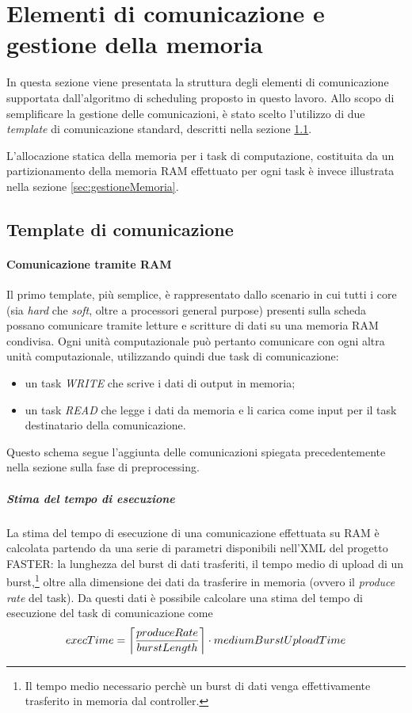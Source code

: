 
\section{Elementi di comunicazione e gestione della memoria}
\label{sec:elementiComunicazioneGestioneMemoria}
In questa sezione viene presentata la struttura degli elementi di comunicazione 
supportata dall'algoritmo di scheduling proposto in questo lavoro.
Allo scopo di semplificare la gestione delle comunicazioni, è stato scelto 
l'utilizzo di due \emph{template} di comunicazione standard, descritti nella 
sezione \ref{sec:templateComunicazione}.

L'allocazione statica della memoria per i task di computazione, costituita da 
un partizionamento della memoria \acs{RAM} effettuato per ogni task è invece 
illustrata nella sezione \ref{sec:gestioneMemoria}.


\subsection{Template di comunicazione}
\label{sec:templateComunicazione}

\paragraph{Comunicazione tramite \acs{RAM}}
Il primo template, più semplice, è rappresentato dallo scenario in cui tutti i 
core (sia \emph{hard} che \emph{soft}, oltre a processori general purpose) presenti sulla 
scheda possano comunicare tramite letture e scritture di dati su una memoria 
\acs{RAM} condivisa. Ogni unità computazionale può pertanto comunicare con ogni 
altra unità computazionale, utilizzando quindi due task di comunicazione:
\begin{itemize}
 \item un task \emph{WRITE} che scrive i dati di output in memoria;
 \item un task \emph{READ} che legge i dati da memoria e li carica come input 
per il task destinatario della comunicazione.
\end{itemize}
Questo schema segue l'aggiunta delle comunicazioni spiegata precedentemente 
nella sezione sulla fase di preprocessing.

\subparagraph{Stima del tempo di esecuzione}
La stima del tempo di esecuzione di una comunicazione effettuata su \acs{RAM} è 
calcolata partendo da una serie di parametri disponibili nell'XML del progetto 
\ac{FASTER}: la lunghezza del burst di dati trasferiti, il tempo medio di upload 
di un burst,\footnote{Il tempo medio necessario perchè un burst di dati venga 
effettivamente trasferito in memoria dal controller.} oltre alla dimensione 
dei dati da trasferire in memoria (ovvero il \emph{produce rate} del task). Da 
questi dati è possibile calcolare una stima del tempo di esecuzione del task di 
comunicazione come
\begin{equation}
execTime = \ceil[\bigg]{\frac{produceRate}{burstLength}} \cdot 
mediumBurstUploadTime
\end{equation}

